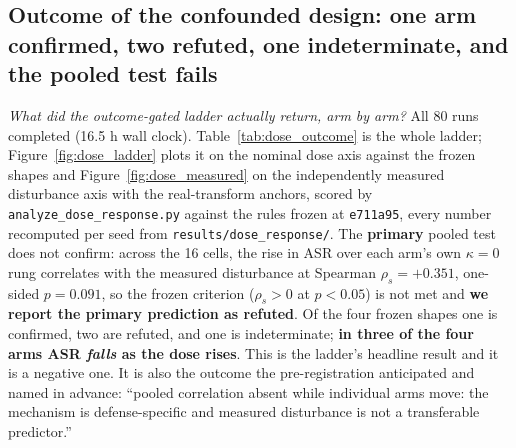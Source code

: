\documentclass{article}
\begin{document}
\subsection{Outcome of the confounded design: one arm confirmed, two refuted, one indeterminate, and the pooled test fails}
\label{sec:dose_outcome}

\noindent \emph{What did the outcome-gated ladder actually return, arm by arm?}
All 80 runs completed (16.5 h wall clock). Table~\ref{tab:dose_outcome} is the whole ladder; Figure~\ref{fig:dose_ladder} plots it on the nominal dose axis against the frozen shapes and Figure~\ref{fig:dose_measured} on the independently measured disturbance axis with the real-transform anchors, scored by \texttt{analyze\_dose\_response.py} against the rules frozen at \texttt{e711a95}, every number recomputed per seed from \texttt{results/dose\_response/}. The \textbf{primary} pooled test does not confirm: across the 16 cells, the rise in ASR over each arm's own $\kappa{=}0$ rung correlates with the measured disturbance at Spearman $\rho_s = +0.351$, one-sided $p = 0.091$, so the frozen criterion ($\rho_s > 0$ at $p < 0.05$) is not met and \textbf{we report the primary prediction as refuted}. Of the four frozen shapes one is confirmed, two are refuted, and one is indeterminate; \textbf{in three of the four arms ASR \emph{falls} as the dose rises}. This is the ladder's headline result and it is a negative one. It is also the outcome the pre-registration anticipated and named in advance: ``pooled correlation absent while individual arms move: the mechanism is defense-specific and measured disturbance is not a transferable predictor.''
\end{document}

